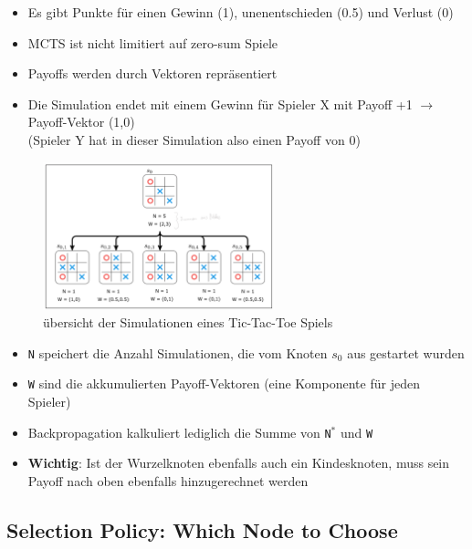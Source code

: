 \documentclass[a4paper]{article}
\begin{document}
		\begin{itemize}
			\item Es gibt Punkte für einen Gewinn (1), unenentschieden (0.5) und Verlust (0)
			\item MCTS ist nicht limitiert auf zero-sum Spiele
			\item Payoffs werden durch Vektoren repräsentiert
			\item Die Simulation endet mit einem Gewinn für Spieler X mit Payoff +1 $\rightarrow$ Payoff-Vektor (1,0) \\
			(Spieler Y hat in dieser Simulation also einen Payoff von 0)
		\end{itemize}
	
		\begin{figure}[htb!]
			\centering
			\includegraphics[width=0.6\textwidth]{img/02_mcts/ttt_payoffs.png}
			\caption{übersicht der Simulationen eines Tic-Tac-Toe Spiels}
			\label{fig:02_mcts_ttt_payoffs}
		\end{figure}
	
		\begin{itemize}
			\item \texttt{N} speichert die Anzahl Simulationen, die vom Knoten $s_{0}$ aus gestartet wurden
			\item \texttt{W} sind die akkumulierten Payoff-Vektoren (eine Komponente für jeden Spieler)
			\item Backpropagation kalkuliert lediglich die Summe von \texttt{N}$^{*}$ und \texttt{W}
			\item \textbf{Wichtig}: Ist der Wurzelknoten ebenfalls auch ein Kindesknoten, muss sein Payoff nach oben ebenfalls hinzugerechnet werden 
		\end{itemize}
	
		\newpage
	
		\subsection{Selection Policy: Which Node to Choose}
		
\end{document}

